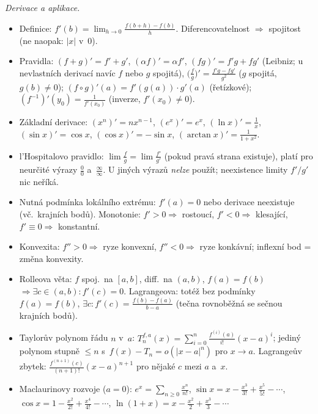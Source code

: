 \documentclass[11pt,a4paper]{article}
\begin{document}
\begin{poznamka}
\smallskip
\emph{Derivace a aplikace.}
\begin{itemize}
  \item Definice: $f'(b)=\lim_{h\to0}\tfrac{f(b+h)-f(b)}{h}$. Diferencovatelnost $\Rightarrow$ spojitost (ne naopak: $|x|$ v~$0$).
  \item Pravidla: $(f+g)'=f'+g'$, $(\alpha f)'=\alpha f'$, $(fg)'=f'g+fg'$ (Leibniz; u nevlastních derivací navíc $f$ nebo $g$ spojitá), $\bigl(\tfrac fg\bigr)'=\tfrac{f'g-fg'}{g^2}$ ($g$ spojitá, $g(b)\neq0$); $(f\circ g)'(a)=f'(g(a))\cdot g'(a)$ (řetízkové); $(f^{-1})'(y_0)=\tfrac{1}{f'(x_0)}$ (inverze, $f'(x_0)\neq0$).
  \item Základní derivace: $(x^n)'=nx^{n-1}$, $(e^x)'=e^x$, $(\ln x)'=\tfrac1x$, $(\sin x)'=\cos x$, $(\cos x)'=-\sin x$, $(\arctan x)'=\tfrac{1}{1+x^2}$.
  \item l'Hospitalovo pravidlo: $\lim\tfrac fg=\lim\tfrac{f'}{g'}$ (pokud pravá strana existuje), platí pro neurčité výrazy $\tfrac00$ a~$\tfrac\infty\infty$. U jiných výrazů \emph{nelze} použít; neexistence limity $f'/g'$ nic neříká.
  \item Nutná podmínka lokálního extrému: $f'(a)=0$ nebo derivace neexistuje (vč.\ krajních bodů). Monotonie: $f'>0\Rightarrow$ rostoucí, $f'<0\Rightarrow$ klesající, $f'\equiv0\Rightarrow$ konstantní.
  \item Konvexita: $f''>0\Rightarrow$ ryze konvexní, $f''<0\Rightarrow$ ryze konkávní; inflexní bod = změna konvexity.
  \item Rolleova věta: $f$ spoj.\ na $[a,b]$, diff.\ na $(a,b)$, $f(a)=f(b)$ $\Rightarrow\exists c\in(a,b):f'(c)=0$. Lagrangeova: totéž bez podmínky $f(a)=f(b)$, $\exists c:f'(c)=\tfrac{f(b)-f(a)}{b-a}$ (tečna rovnoběžná se sečnou krajních bodů).
  \item Taylorův polynom řádu $n$ v~$a$: $T_n^{f,a}(x)=\sum_{i=0}^{n}\tfrac{f^{(i)}(a)}{i!}(x-a)^i$; jediný polynom stupně $\le n$ s~$f(x)-T_n=o(|x-a|^n)$ pro $x\to a$. Lagrangeův zbytek: $\tfrac{f^{(n+1)}(c)}{(n+1)!}(x-a)^{n+1}$ pro nějaké $c$ mezi $a$ a~$x$.
  \item Maclaurinovy rozvoje ($a=0$): $e^x=\sum_{n\ge0}\tfrac{x^n}{n!}$, $\sin x=x-\tfrac{x^3}{3!}+\tfrac{x^5}{5!}-\cdots$, $\cos x=1-\tfrac{x^2}{2!}+\tfrac{x^4}{4!}-\cdots$, $\ln(1+x)=x-\tfrac{x^2}{2}+\tfrac{x^3}{3}-\cdots$
\end{itemize}


\end{poznamka}
\end{document}

